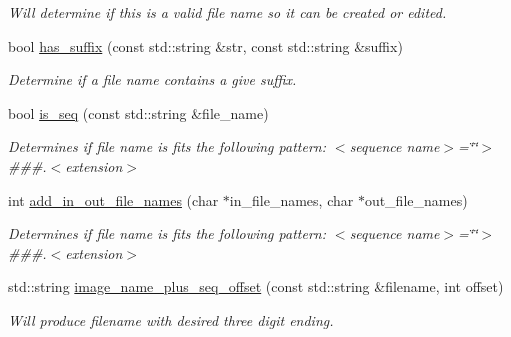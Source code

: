 \begin{DoxyCompactItemize}
\begin{DoxyCompactList}\small\item\em Will determine if this is a valid file name so it can be created or edited. \end{DoxyCompactList}\item 
bool \hyperlink{classimage__tools_1_1MIACommandlineManager_a5b890fca7c4d82969a988f559856e453}{has\+\_\+suffix} (const std\+::string \&str, const std\+::string \&suffix)
\begin{DoxyCompactList}\small\item\em Determine if a file name contains a give suffix. \end{DoxyCompactList}\item 
bool \hyperlink{classimage__tools_1_1MIACommandlineManager_a9494f1e26c810e4c74413ff9ee921d06}{is\+\_\+seq} (const std\+::string \&file\+\_\+name)
\begin{DoxyCompactList}\small\item\em Determines if file name is fits the following pattern\+: $<$sequence name$>$=\char`\"{}\char`\"{}$>$\#\#\#.$<$extension$>$ \end{DoxyCompactList}\item 
int \hyperlink{classimage__tools_1_1MIACommandlineManager_afa5690c9e62a1c5e1df8fdeef907df70}{add\+\_\+in\+\_\+out\+\_\+file\+\_\+names} (char $\ast$in\+\_\+file\+\_\+names, char $\ast$out\+\_\+file\+\_\+names)
\begin{DoxyCompactList}\small\item\em Determines if file name is fits the following pattern\+: $<$sequence name$>$=\char`\"{}\char`\"{}$>$\#\#\#.$<$extension$>$ \end{DoxyCompactList}\item 
std\+::string \hyperlink{classimage__tools_1_1MIACommandlineManager_ae511c474da37d2ae793b92a2ec3bb567}{image\+\_\+name\+\_\+plus\+\_\+seq\+\_\+offset} (const std\+::string \&filename, int offset)
\begin{DoxyCompactList}\small\item\em Will produce filename with desired three digit ending. \end{DoxyCompactList}\end{DoxyCompactItemize}
